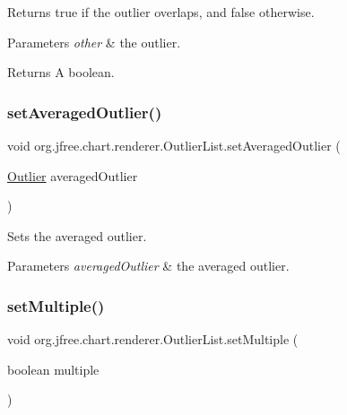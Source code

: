 Returns {\ttfamily true} if the outlier overlaps, and {\ttfamily false} otherwise.


\begin{DoxyParams}{Parameters}
{\em other} & the outlier.\\
\hline
\end{DoxyParams}
\begin{DoxyReturn}{Returns}
A boolean. 
\end{DoxyReturn}
\mbox{\label{classorg_1_1jfree_1_1chart_1_1renderer_1_1_outlier_list_a1353a78e42c50e1306be7ac20f491ce8}} 
\subsubsection{\texorpdfstring{set\+Averaged\+Outlier()}{setAveragedOutlier()}}
{\footnotesize\ttfamily void org.\+jfree.\+chart.\+renderer.\+Outlier\+List.\+set\+Averaged\+Outlier (\begin{DoxyParamCaption}\item[{\mbox{\hyperlink{classorg_1_1jfree_1_1chart_1_1renderer_1_1_outlier}{Outlier}}}]{averaged\+Outlier }\end{DoxyParamCaption})}

Sets the averaged outlier.


\begin{DoxyParams}{Parameters}
{\em averaged\+Outlier} & the averaged outlier. \\
\hline
\end{DoxyParams}
\mbox{\label{classorg_1_1jfree_1_1chart_1_1renderer_1_1_outlier_list_acd5a5b3f307747eaea2de955a89c295a}} 
\subsubsection{\texorpdfstring{set\+Multiple()}{setMultiple()}}
{\footnotesize\ttfamily void org.\+jfree.\+chart.\+renderer.\+Outlier\+List.\+set\+Multiple (\begin{DoxyParamCaption}\item[{boolean}]{multiple }\end{DoxyParamCaption})}

